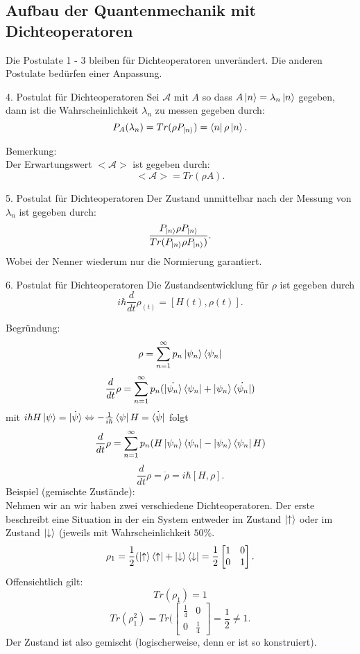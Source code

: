 \documentclass{report}
\begin{document}
\subsection{Aufbau der Quantenmechanik mit Dichteoperatoren}
Die Postulate 1 - 3 bleiben für Dichteoperatoren unverändert. Die anderen Postulate bedürfen einer Anpassung.
\begin{redbox}{4. Postulat für Dichteoperatoren}
	Sei $\mathcal{A}$ mit $A$ so dass $A\ket{n} = \lambda_n \ket{n} $ gegeben, dann ist die Wahrscheinlichkeit $\lambda_n$ zu messen gegeben durch: \[
		P_A(\lambda_n)=Tr(\rho P_{\ket{n} })=\bra{n} \rho\ket{n} 
	.\] 
\end{redbox}
Bemerkung:\\
Der Erwartungswert $<\mathcal{A}>$ ist gegeben durch: \[
	<\mathcal{A}> = Tr(\rho A)
.\] 
\begin{redbox}{5. Postulat für Dichteoperatoren}
	Der Zustand unmittelbar nach der Messung von $\lambda_n$ ist gegeben durch: \[
		\frac{P_{\ket{n} }\rho P_{\ket{n} }}{Tr(P_{\ket{n} }\rho P_{\ket{n}} )}
	.\] Wobei der Nenner wiederum nur die Normierung garantiert.
\end{redbox}
\begin{redbox}{6. Postulat für Dichteoperatoren}
	Die Zustandsentwicklung für $\rho$ ist gegeben durch \[
		i\hbar \frac{d}{dt}\rho_(t) = [H(t), \rho(t)]
	.\] 
\end{redbox}
Begründung: \\
\[
\rho = \sum_{n=1}^{\infty} p_n \ket{\psi_n} \bra{\psi_n}
\]
\[
	\frac{d}{dt}\rho = \sum_{n=1}^{\infty} p_n (\dot{\ket{\psi_n}} \bra{\psi_n} + \ket{\psi_n} \dot{\bra{\psi_n} }) 
\] mit $i\hbar H \ket{\psi} = \dot{\ket{\psi}}  \Leftrightarrow -\frac{1}{i\hbar} \bra{\psi} H = \dot{\bra{\psi}} $ folgt \[
\frac{d}{dt}\rho = \sum_{n=1}^{\infty} p_n (H \ket{\psi_n} \bra{\psi_n} - \ket{\psi_n} \bra{\psi_n} H)
\]\[
\frac{d}{dt} \rho = \dot{\rho} = i\hbar [H, \rho]
.\] 
Beispiel (gemischte Zustände):\\ 
Nehmen wir an wir haben zwei verschiedene Dichteoperatoren. Der erste beschreibt eine Situation in der ein System entweder im Zustand $\ket{\uparrow}$ oder im Zustand $\ket{\downarrow}$ (jeweils mit Wahrscheinlichkeit $50\%$.\[
	\rho_1 = \frac{1}{2} (\ket{\uparrow} \bra{\uparrow} + \ket{\downarrow} \bra{\downarrow} = \frac{1}{2} \begin{bmatrix} 1 & 0 \\ 0 & 1 \end{bmatrix}  
.\] Offensichtlich gilt: \[
Tr(\rho_1) = 1
\] \[
Tr(\rho_1^2) = Tr(\begin{bmatrix} \frac{1}{4} & 0 \\ 0 & \frac{1}{4} \end{bmatrix} = \frac{1}{2} \neq 1
.\] Der Zustand ist also gemischt (logischerweise, denn er ist so konstruiert). \\
\end{document}
